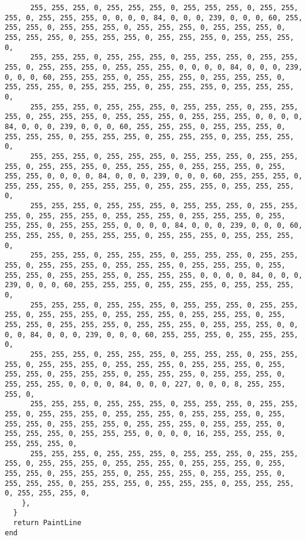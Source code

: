 \documentclass{ctexart}
\begin{document}
\begin{lstlisting}
      255, 255, 255, 0, 255, 255, 255, 0, 255, 255, 255, 0, 255, 255, 255, 0, 255, 255, 255, 0, 0, 0, 0, 84, 0, 0, 0, 239, 0, 0, 0, 60, 255, 255, 255, 0, 255, 255, 255, 0, 255, 255, 255, 0, 255, 255, 255, 0, 255, 255, 255, 0, 255, 255, 255, 0, 255, 255, 255, 0, 255, 255, 255, 0, 
      255, 255, 255, 0, 255, 255, 255, 0, 255, 255, 255, 0, 255, 255, 255, 0, 255, 255, 255, 0, 255, 255, 255, 0, 0, 0, 0, 84, 0, 0, 0, 239, 0, 0, 0, 60, 255, 255, 255, 0, 255, 255, 255, 0, 255, 255, 255, 0, 255, 255, 255, 0, 255, 255, 255, 0, 255, 255, 255, 0, 255, 255, 255, 0, 
      255, 255, 255, 0, 255, 255, 255, 0, 255, 255, 255, 0, 255, 255, 255, 0, 255, 255, 255, 0, 255, 255, 255, 0, 255, 255, 255, 0, 0, 0, 0, 84, 0, 0, 0, 239, 0, 0, 0, 60, 255, 255, 255, 0, 255, 255, 255, 0, 255, 255, 255, 0, 255, 255, 255, 0, 255, 255, 255, 0, 255, 255, 255, 0, 
      255, 255, 255, 0, 255, 255, 255, 0, 255, 255, 255, 0, 255, 255, 255, 0, 255, 255, 255, 0, 255, 255, 255, 0, 255, 255, 255, 0, 255, 255, 255, 0, 0, 0, 0, 84, 0, 0, 0, 239, 0, 0, 0, 60, 255, 255, 255, 0, 255, 255, 255, 0, 255, 255, 255, 0, 255, 255, 255, 0, 255, 255, 255, 0, 
      255, 255, 255, 0, 255, 255, 255, 0, 255, 255, 255, 0, 255, 255, 255, 0, 255, 255, 255, 0, 255, 255, 255, 0, 255, 255, 255, 0, 255, 255, 255, 0, 255, 255, 255, 0, 0, 0, 0, 84, 0, 0, 0, 239, 0, 0, 0, 60, 255, 255, 255, 0, 255, 255, 255, 0, 255, 255, 255, 0, 255, 255, 255, 0, 
      255, 255, 255, 0, 255, 255, 255, 0, 255, 255, 255, 0, 255, 255, 255, 0, 255, 255, 255, 0, 255, 255, 255, 0, 255, 255, 255, 0, 255, 255, 255, 0, 255, 255, 255, 0, 255, 255, 255, 0, 0, 0, 0, 84, 0, 0, 0, 239, 0, 0, 0, 60, 255, 255, 255, 0, 255, 255, 255, 0, 255, 255, 255, 0, 
      255, 255, 255, 0, 255, 255, 255, 0, 255, 255, 255, 0, 255, 255, 255, 0, 255, 255, 255, 0, 255, 255, 255, 0, 255, 255, 255, 0, 255, 255, 255, 0, 255, 255, 255, 0, 255, 255, 255, 0, 255, 255, 255, 0, 0, 0, 0, 84, 0, 0, 0, 239, 0, 0, 0, 60, 255, 255, 255, 0, 255, 255, 255, 0, 
      255, 255, 255, 0, 255, 255, 255, 0, 255, 255, 255, 0, 255, 255, 255, 0, 255, 255, 255, 0, 255, 255, 255, 0, 255, 255, 255, 0, 255, 255, 255, 0, 255, 255, 255, 0, 255, 255, 255, 0, 255, 255, 255, 0, 255, 255, 255, 0, 0, 0, 0, 84, 0, 0, 0, 227, 0, 0, 0, 8, 255, 255, 255, 0, 
      255, 255, 255, 0, 255, 255, 255, 0, 255, 255, 255, 0, 255, 255, 255, 0, 255, 255, 255, 0, 255, 255, 255, 0, 255, 255, 255, 0, 255, 255, 255, 0, 255, 255, 255, 0, 255, 255, 255, 0, 255, 255, 255, 0, 255, 255, 255, 0, 255, 255, 255, 0, 0, 0, 0, 16, 255, 255, 255, 0, 255, 255, 255, 0, 
      255, 255, 255, 0, 255, 255, 255, 0, 255, 255, 255, 0, 255, 255, 255, 0, 255, 255, 255, 0, 255, 255, 255, 0, 255, 255, 255, 0, 255, 255, 255, 0, 255, 255, 255, 0, 255, 255, 255, 0, 255, 255, 255, 0, 255, 255, 255, 0, 255, 255, 255, 0, 255, 255, 255, 0, 255, 255, 255, 0, 255, 255, 255, 0, 
    },
  }
  return PaintLine
end


\end{lstlisting}
\end{document}
